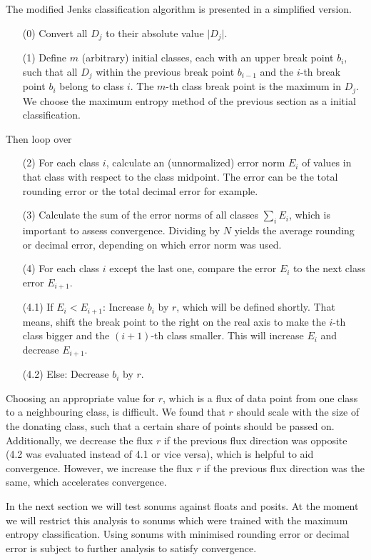 The modified Jenks classification algorithm is presented in a simplified version.
\begin{itemize}
    \item[(0)] Convert all $D_j$ to their absolute value $\vert D_j \vert$.
    \item[(1)] Define $m$ (arbitrary) initial classes, each with an upper break point $b_i$, such that all $D_j$ within the previous break point $b_{i-1}$ and the $i$-th break point $b_i$ belong to class $i$. The $m$-th class break point is the maximum in $D_j$. We choose the maximum entropy method of the previous section as a initial classification.
\end{itemize}
Then loop over
\begin{itemize}
    \item[(2)] For each class $i$, calculate an (unnormalized) error norm $E_i$ of values in that class with respect to the class midpoint. The error can be the total rounding error or the total decimal error for example.
    \item[(3)] Calculate the sum of the error norms of all classes $\sum_i E_i$, which is important to assess convergence. Dividing by $N$ yields the average rounding or decimal error, depending on which error norm was used.
    \item[(4)] For each class $i$ except the last one, compare the error $E_i$ to the next class error $E_{i+1}$.
    \item[(4.1)] If $E_i < E_{i+1}$: Increase $b_i$ by $r$, which will be defined shortly. That means, shift the break point to the right on the real axis to make the $i$-th class bigger and the $(i+1)$-th class smaller. This will increase $E_i$ and decrease $E_{i+1}$.
    \item[(4.2)] Else: Decrease $b_i$ by $r$.
\end{itemize}
Choosing an appropriate value for $r$, which is a flux of data point from one class to a neighbouring class, is difficult. We found that $r$ should scale with the size of the donating class, such that a certain share of points should be passed on. Additionally, we decrease the flux $r$ if the previous flux direction was opposite (4.2 was evaluated instead of 4.1 or vice versa), which is helpful to aid convergence. However, we increase the flux $r$ if the previous flux direction was the same, which accelerates convergence.

In the next section we will test sonums against floats and posits. At the moment we will restrict this analysis to sonums which were trained with the maximum entropy classification. Using sonums with minimised rounding error or decimal error is subject to further analysis to satisfy convergence.

